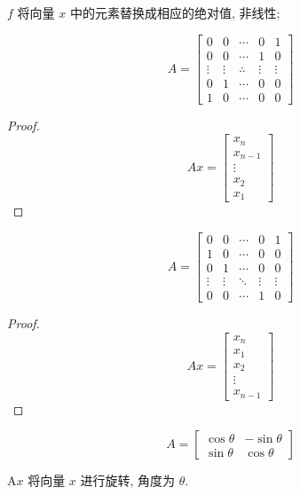\begin{example}
    $ f $ 将向量 $ x $ 中的元素替换成相应的绝对值, 非线性;
\end{example}

\begin{example}[反转矩阵]
    $$ A=\left[\begin{array}{ccccc}0 & 0 & \cdots & 0 & 1 \\ 0 & 0 & \cdots & 1 & 0 \\ \vdots & \vdots & \therefore & \vdots & \vdots \\ 0 & 1 & \cdots & 0 & 0 \\ 1 & 0 & \cdots & 0 & 0\end{array}\right] $$
\end{example}

\begin{proof}
    $$ A x=\left[\begin{array}{c}x_{n} \\ x_{n-1} \\ \vdots \\ x_{2} \\ x_{1}\end{array}\right] $$
\end{proof}

\begin{example}[循环移位矩阵]
    $$ A=\left[\begin{array}{ccccc}0 & 0 & \cdots & 0 & 1 \\ 1 & 0 & \cdots & 0 & 0 \\ 0 & 1 & \cdots & 0 & 0 \\ \vdots & \vdots & \ddots & \vdots & \vdots \\ 0 & 0 & \cdots & 1 & 0\end{array}\right] $$
\end{example}

\begin{proof}
    $$ A x=\left[\begin{array}{c}x_{n} \\ x_{1} \\ x_{2} \\ \vdots \\ x_{n-1}\end{array}\right] $$
\end{proof}

\begin{example}[旋转矩阵]
    $$ A=\left[\begin{array}{cc}\cos \theta & -\sin \theta \\ \sin \theta & \cos \theta\end{array}\right] $$

    $ \mathrm{A} x $ 将向量 $ x $ 进行旋转, 角度为 $ \theta $.
\end{example}

